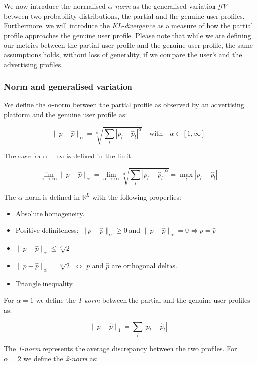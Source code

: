 We now introduce the normalised \emph{$\alpha$-norm} as the generalised variation $\mathcal{GV}$ between two probability distributions, the partial and the genuine user profiles. Furthermore, we will introduce the \emph{KL-divergence} as a measure of how the partial profile approaches the genuine user profile. Please note that while we are defining our metrics between the partial user profile and the genuine user profile, the same assumptions holds, without loss of generality, if we compare the user's and the advertising profiles.

\subsubsection{Norm and generalised variation}

We define the $\alpha$-norm between the partial profile as observed by an advertising platform and the genuine user profile as:

$$ \| p - \hat{p} \|_\alpha = \sqrt[\alpha]{\sum_l{ {| p_l - \hat{p}_l |}^\alpha }} \quad  \text{with} \quad  \alpha \in [1, \infty] $$

The case for $\alpha = \infty$ is defined in the limit:

$$\lim_{\alpha\to\infty} \| p - \hat{p} \|_\alpha = \lim_{\alpha\to\infty} \sqrt[\alpha]{\sum_l{ {| p_l - \hat{p}_l |}^\alpha }} = \max_l { | p_l - \hat{p}_l | } $$

The $\alpha$-norm is defined in $\mathbb{R}^L$ with the following properties:

\begin{itemize}
 \item Absolute homogeneity.
 \item Positive definiteness: $ \| p - \hat{p} \|_\alpha \ge 0$ and $  \| p - \hat{p} \|_\alpha = 0 \Leftrightarrow p = \hat{p} $ 
 \item $ \| p - \hat{p} \|_\alpha \le \sqrt[\alpha]{2}$ 
 \item $ \| p - \hat{p} \|_\alpha = \sqrt[\alpha]{2}$ $\Leftrightarrow$ $p$ and $\hat{p}$ are orthogonal deltas.
 \item Triangle inequality.
\end{itemize}

For $\alpha = 1$ we define the \emph{1-norm} between the partial and the genuine user profiles as:

$$ \| p - \hat{p} \|_1 = \sum_l{ | p_{l} - \hat{p}_{l} | }  $$

The \emph{1-norm} represents the average discrepancy between the two profiles. For $\alpha = 2$ we define the \emph{2-norm} as:

